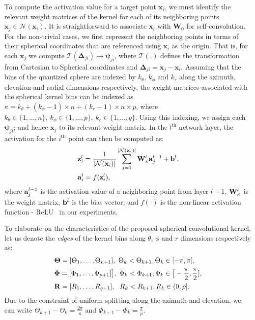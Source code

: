 \documentclass[10pt,twocolumn,letterpaper]{article}
\begin{document}
To compute the activation value for a target point $\mathbf{x}_i$, we must identify the relevant weight matrices of the kernel for each of its neighboring points $\mathbf{x}_j\in \mathcal{N}(\mathbf{x}_i)$.
It is straightforward to associate $\mathbf{x}_i$ with $\mathbf{W}_0$ for self-convolution. For the non-trivial cases, we first represent the neighboring points in terms of their spherical coordinates that are referenced using $\mathbf{x}_i$ as the origin. That is, for each $\mathbf{x}_j$ we compute $\mathcal T(\boldsymbol{\Delta}_{ji})\rightarrow \boldsymbol{\psi}_{ji}$, where $\mathcal T(.)$ defines the transformation from Cartesian to Spherical coordinates and  $\boldsymbol{\Delta}_{ji}=\mathbf{x}_j-\mathbf{x}_i$.
Assuming that the bins of the quantized sphere are indexed by $k_\theta$, $k_\phi$ and $k_r$ along the azimuth, elevation and radial dimensions respectively, the weight matrices associated with the spherical kernel bins can be indexed as $\kappa = k_\theta + (k_\phi-1)\times n + (k_r-1)\times n\times p$, where $k_\theta \in \{1,\dots,n\},~k_\phi \in \{1,\dots,p\},~k_r \in \{1,\dots,q\}$. Using this indexing, we assign  each $\boldsymbol{\psi}_{ji}$; and hence $\mathbf{x}_j$ to its relevant weight matrix.
In the $l^{\text{th}}$ network layer, the activation for the $i^{\text{th}}$ point can then be computed as:
\begin{align}\label{spatio-conv}
  &\bold{z}^l_i  = \frac{1}{|\mathcal{N}(\bold{x}_i)|}\sum\limits_{j = 1}^{|\mathcal{N}(\bold{x}_i)|}\bold{W}^l_{\kappa}\bold{a}^{l-1}_j+\bold{b}^l,\\
  &\bold{a}^l_i = f(\bold{z}^l_i),
  \end{align}
where $\bold{a}^{l-1}_j$ is the activation value of a neighboring point from layer $l-1$, $\bold{W}^l_{\kappa}$ is the weight matrix, $\bold{b}^l$ is the bias vector, and $f(\cdot)$ is the non-linear activation function - ReLU~\cite{nair2010rectified} in our experiments.


To elaborate on the characteristics of the proposed spherical convolutional kernel, let us denote the \emph{edges} of the kernel bins along $\theta$, $\phi$ and $r$ dimensions respectively as:
\begin{align}
\notag
&\boldsymbol{\Theta}=[\Theta_1,\dots,\Theta_{n+1}], ~\Theta_k<\Theta_{k+1}, {\Theta}_k\in[-\pi,\pi], \\
\notag
&\boldsymbol{\Phi}=[\Phi_1,\dots, \Phi_{p+1}]\big],~\Phi_k<\Phi_{k+1}, {\Phi}_k\in\big[-\frac{\pi}{2}, \frac{\pi}{2}], \\
\notag
&\bold{R}=[R_1,\dots,R_{q+1}], ~~R_k<R_{k+1}, R_k\in(0,\rho].
\end{align}
Due to the constraint of uniform splitting along the azimuth and elevation, we can write  ${\Theta}_{k+1}-{\Theta}_k=\frac{2\pi}{n}$ and ${\Phi}_{k+1}-{\Phi}_k=\frac{\pi}{p}$.
\end{document}
